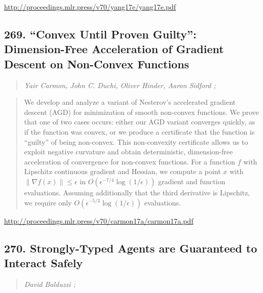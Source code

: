 \documentclass{article}
\begin{document}
\href{http://proceedings.mlr.press/v70/yang17e/yang17e.pdf}{http://proceedings.mlr.press/v70/yang17e/yang17e.pdf}

\subsection{269. “Convex Until Proven Guilty”: Dimension-Free Acceleration of Gradient Descent on Non-Convex Functions}

\begin{quote}
\footnotesize{\textit{Yair Carmon, John C. Duchi, Oliver Hinder, Aaron Sidford ;}}

\end{quote}

\begin{quote}
    We develop and analyze a variant of Nesterov’s accelerated gradient descent (AGD) for minimization of smooth non-convex functions. We prove that one of two cases occurs: either our AGD variant converges quickly, as if the function was convex, or we produce a certificate that the function is “guilty” of being non-convex. This non-convexity certificate allows us to exploit negative curvature and obtain deterministic, dimension-free acceleration of convergence for non-convex functions. For a function $f$ with Lipschitz continuous gradient and Hessian, we compute a point $x$ with $\|\nabla f(x)\| \le \epsilon$ in $O(\epsilon^{-7/4} \log(1/ \epsilon) )$ gradient and function evaluations. Assuming additionally that the third derivative is Lipschitz, we require only $O(\epsilon^{-5/3} \log(1/ \epsilon) )$ evaluations.  
\end{quote}

\href{http://proceedings.mlr.press/v70/carmon17a/carmon17a.pdf}{http://proceedings.mlr.press/v70/carmon17a/carmon17a.pdf}

\subsection{270. Strongly-Typed Agents are Guaranteed to Interact Safely}

\begin{quote}
\footnotesize{\textit{David Balduzzi ;}}

\end{quote}
\end{document}
